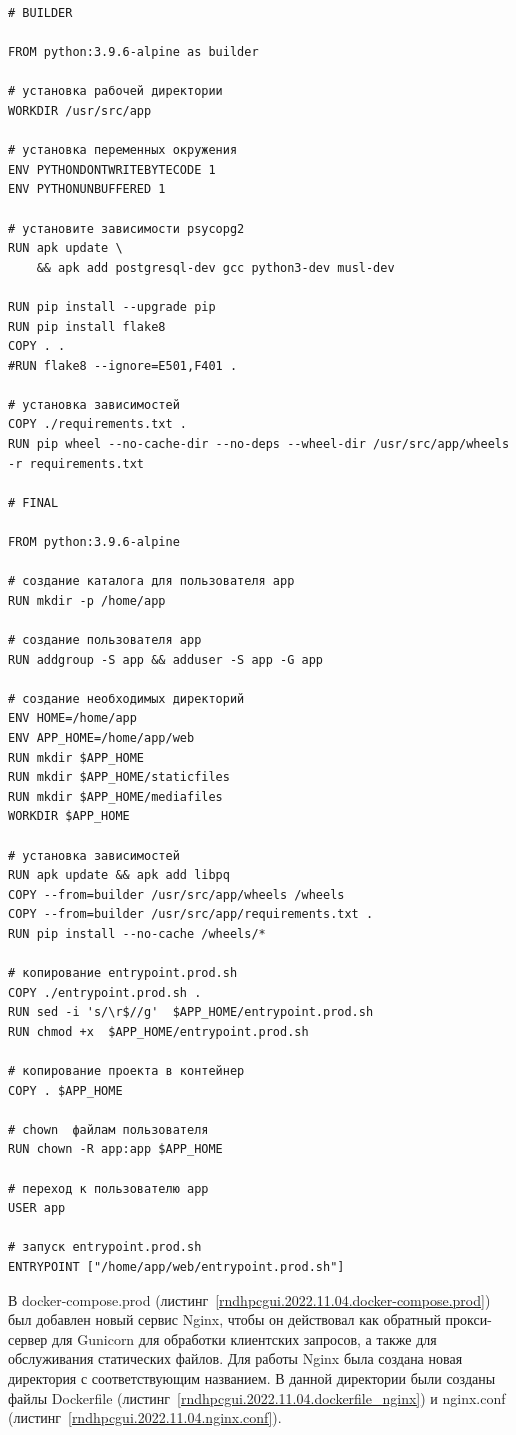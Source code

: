 \begin{lstlisting}[frame=single, label={dockerfile.prod}, caption={Dockerfile.prod}, language={docker}] 
# BUILDER

FROM python:3.9.6-alpine as builder

# установка рабочей директории
WORKDIR /usr/src/app

# установка переменных окружения
ENV PYTHONDONTWRITEBYTECODE 1
ENV PYTHONUNBUFFERED 1

# установите зависимости psycopg2
RUN apk update \
    && apk add postgresql-dev gcc python3-dev musl-dev

RUN pip install --upgrade pip
RUN pip install flake8
COPY . .
#RUN flake8 --ignore=E501,F401 .

# установка зависимостей
COPY ./requirements.txt .
RUN pip wheel --no-cache-dir --no-deps --wheel-dir /usr/src/app/wheels -r requirements.txt

# FINAL

FROM python:3.9.6-alpine

# создание каталога для пользователя app
RUN mkdir -p /home/app

# создание пользователя app
RUN addgroup -S app && adduser -S app -G app

# создание необходимых директорий
ENV HOME=/home/app
ENV APP_HOME=/home/app/web
RUN mkdir $APP_HOME
RUN mkdir $APP_HOME/staticfiles
RUN mkdir $APP_HOME/mediafiles
WORKDIR $APP_HOME

# установка зависимостей
RUN apk update && apk add libpq
COPY --from=builder /usr/src/app/wheels /wheels
COPY --from=builder /usr/src/app/requirements.txt .
RUN pip install --no-cache /wheels/*

# копирование entrypoint.prod.sh
COPY ./entrypoint.prod.sh .
RUN sed -i 's/\r$//g'  $APP_HOME/entrypoint.prod.sh
RUN chmod +x  $APP_HOME/entrypoint.prod.sh

# копирование проекта в контейнер
COPY . $APP_HOME

# chown  файлам пользователя
RUN chown -R app:app $APP_HOME

# переход к пользователю app
USER app

# запуск entrypoint.prod.sh
ENTRYPOINT ["/home/app/web/entrypoint.prod.sh"]
\end{lstlisting}
	
В \textsf{docker-compose.prod} (листинг~\ref{rndhpcgui.2022.11.04.docker-compose.prod}) был добавлен новый сервис \textsf{Nginx}, чтобы он действовал как обратный прокси-сервер для \textsf{Gunicorn} для обработки клиентских запросов, а также для обслуживания статических файлов. Для работы \textsf{Nginx} была создана новая директория с соответствующим названием. В данной директории были созданы файлы \textsf{Dockerfile} (листинг~\ref{rndhpcgui.2022.11.04.dockerfile_nginx}) и \textsf{nginx.conf} (листинг~\ref{rndhpcgui.2022.11.04.nginx.conf}).

